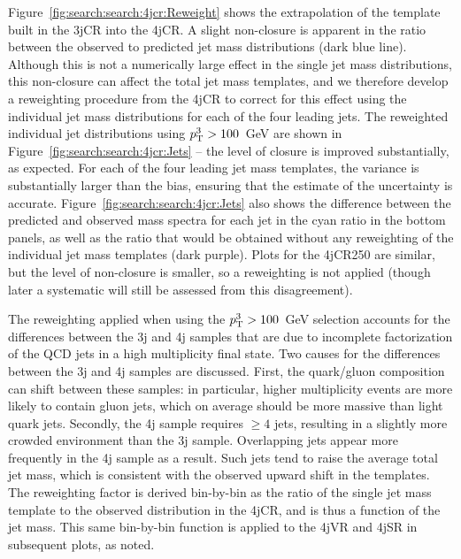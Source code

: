Figure~\ref{fig:search:search:4jcr:Reweight} shows the extrapolation of the template built in the 3jCR into the 4jCR. A slight non-closure is apparent in the ratio between the observed to predicted jet mass distributions (dark blue line). Although this is not a numerically large effect in the single jet mass distributions, this non-closure can affect the total jet mass templates, and we therefore develop a reweighting procedure from the 4jCR to correct for this effect using the individual jet mass distributions for each of the four leading jets. The reweighted individual jet distributions using $p_{\text{T}}^{3}>100$~GeV are shown in Figure~\ref{fig:search:search:4jcr:Jets} --  the level of closure is improved substantially, as expected. For each of the four leading jet mass templates, the variance is substantially larger than the bias, ensuring that the estimate of the uncertainty is accurate. Figure~\ref{fig:search:search:4jcr:Jets} also shows the difference between the predicted and observed mass spectra for each jet in the cyan ratio in the bottom panels, as well as the ratio that would be obtained without any reweighting of the individual jet mass templates (dark purple). Plots for the 4jCR250 are similar, but the level of non-closure is smaller, so a reweighting is not applied (though later a systematic will still be assessed from this disagreement). %

The reweighting applied when using the $p_{\text{T}}^{3}>100$~GeV selection accounts for the differences between the 3j and 4j samples that are due to incomplete factorization of the QCD jets in a high multiplicity final state. Two causes for the differences between the 3j and 4j samples are discussed. First, the quark/gluon composition can shift between these samples: in particular, higher multiplicity events are more likely to contain gluon jets, which on average should be more massive than light quark jets. Secondly, the 4j sample requires $\geq 4$ jets, resulting in a slightly more crowded environment than the 3j sample. Overlapping jets appear more frequently in the 4j sample as a result. Such jets tend to raise the average total jet mass, which is consistent with the observed upward shift in the templates. The reweighting factor is derived bin-by-bin as the ratio of the single jet mass template to the observed distribution in the 4jCR, and is thus a function of the jet mass. This same bin-by-bin function is applied to the 4jVR and 4jSR in subsequent plots, as noted. 


